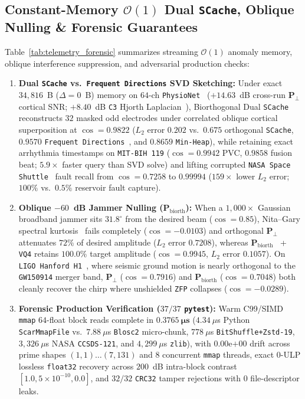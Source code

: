 \documentclass[10pt,twocolumn]{article}
\begin{document}
\subsection{Constant-Memory $\mathcal{O}(1)$ Dual \texttt{SCache}, Oblique Nulling \& Forensic Guarantees}
Table~\ref{tab:telemetry_forensic} summarizes streaming $\mathcal{O}(1)$ anomaly memory, oblique interference suppression, and adversarial production checks:
\begin{enumerate}
    \item \textbf{Dual \texttt{SCache} vs.\ \texttt{Frequent Directions} SVD Sketching:} Under exact $34{,}816$~B ($\Delta=0$~B) memory on $64$-ch \texttt{PhysioNet}~\citep{schalk2004bci2000} ($+14.63$~dB cross-run $\mathbf{P}_\perp$ cortical SNR; $+8.40$~dB \texttt{C3} Hjorth Laplacian~\citep{hjorth1975onlinesource}), Biorthogonal Dual \texttt{SCache} reconstructs $32$ masked odd electrodes under correlated oblique cortical superposition at $\cos=\mathbf{0.9822}$ ($L_2$ error $0.202$ vs.\ $0.675$ orthogonal \texttt{SCache}, $0.9570$ \texttt{Frequent Directions}~\citep{ghashami2016frequent}, and $0.8659$ \texttt{Min-Heap}), while retaining exact arrhythmia timestamps on \texttt{MIT-BIH 119} ($\cos=\mathbf{0.9942}$ PVC, $\mathbf{0.9858}$ fusion beat; $5.9\times$ faster query than SVD solve) and lifting corrupted \texttt{NASA Space Shuttle}~\citep{michie1994statlog} fault recall from $\cos=0.7258$ to $\mathbf{0.99994}$ ($159\times$ lower $L_2$ error; $100\%$ vs.\ $0.5\%$ reservoir fault capture).
    \item \textbf{Oblique $-60$~dB Jammer Nulling ($\mathbf{P}_{\text{biorth}}$):} When a $1{,}000\times$ Gaussian broadband jammer sits $31.8^\circ$ from the desired beam ($\cos=0.85$), Nita--Gary spectral kurtosis~\citep{nita2010generalized} fails completely ($\cos=-0.0103$) and orthogonal $\mathbf{P}_\perp$~\citep{leshem2000multichannel} attenuates $72\%$ of desired amplitude ($L_2$ error $0.7208$), whereas $\mathbf{P}_{\text{biorth}}$~\citep{behrens1994signal} + \texttt{VQ4} retains $\mathbf{100.0\%}$ target amplitude ($\cos=\mathbf{0.9945}$, $L_2$ error $\mathbf{0.1057}$). On \texttt{LIGO Hanford H1}~\citep{abbott2016observation}, where seismic ground motion is nearly orthogonal to the \texttt{GW150914} merger band, $\mathbf{P}_\perp$ ($\cos=0.7916$) and $\mathbf{P}_{\text{biorth}}$ ($\cos=0.7048$) both cleanly recover the chirp where unshielded \texttt{ZFP} collapses ($\cos=-0.0289$).
    \item \textbf{Forensic Production Verification ($37/37$ \texttt{pytest}):} Warm C99/SIMD \texttt{mmap} $64$-float block reads complete in $\mathbf{0.3765~\mu\textbf{s}}$ ($4.34~\mu$s Python \texttt{ScarMmapFile} vs.\ $7.88~\mu$s \texttt{Blosc2} micro-chunk, $778~\mu$s \texttt{BitShuffle+Zstd-19}, $3{,}326~\mu$s NASA \texttt{CCSDS-121}, and $4{,}299~\mu$s \texttt{zlib}), with $0.00\text{e+}00$ drift across prime shapes $(1,1)\dots(7,131)$ and $8$ concurrent \texttt{mmap} threads, exact $0$-ULP lossless \texttt{float32} recovery across $200$~dB intra-block contrast $[1.0, 5\times 10^{-10}, 0.0]$, and $32/32$ \texttt{CRC32} tamper rejections with $0$ file-descriptor leaks.
\end{enumerate}
\end{document}
